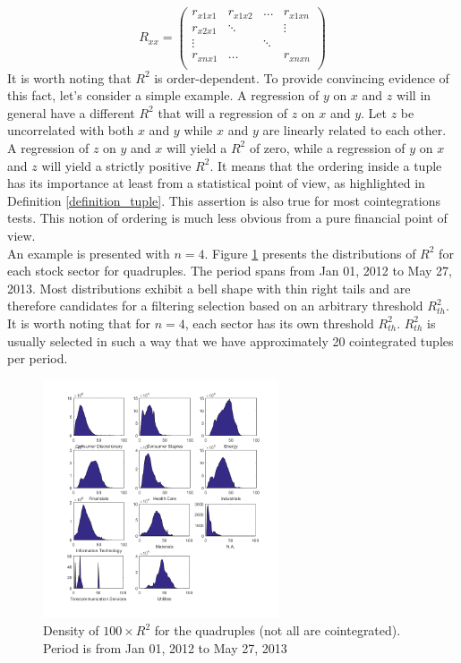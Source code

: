 \documentclass[11pt,a4,twosided,singlespacing,titlepagenumber=on]{scrreprt}
\numberwithin{equation}{chapter} %
\theoremstyle{remark}
\begin{document}
\begin{equation}
R_{xx} =\begin{pmatrix}
r_{x1x1}    & r_{x1x2} & ...  & r_{x1xn}  \\
r_{x2x1}    & \ddots &   & \vdots  \\
\vdots       &   & \ddots &   \\
r_{xnx1}    & \hdots &   & r_{xnxn} \label{rxx} \\
\end{pmatrix} 
\end{equation}
It is worth noting that $R^2$ is order-dependent. To provide convincing evidence of this fact, let's consider a simple example. A regression of $y$ on $x$ and $z$ will in general have a different $R^2$ that will a regression of $z$ on $x$ and $y$. Let $z$ be uncorrelated with both $x$ and $y$ while $x$ and $y$ are linearly related to each other. A regression of $z$ on $y$ and $x$ will yield a $R^2$ of zero, while a regression of $y$ on $x$ and $z$ will yield a strictly positive $R^2$. It means that the ordering inside a tuple has its importance at least from a statistical point of view, as highlighted in Definition \ref{definition_tuple}. This assertion is also true for most cointegrations tests. This notion of ordering is much less obvious from a pure financial point of view. \\

An example is presented with $n=4$. Figure \ref{dist_100_r2_quad} presents the distributions of $R^2$ for each stock sector for quadruples. The period spans from Jan 01, 2012 to May 27, 2013. Most distributions exhibit a bell shape with thin right tails and are therefore candidates for a filtering selection based on an arbitrary threshold $R^2_{th}$. It is worth noting that for $n=4$, each sector has its own threshold $R^2_{th}$. $R^2_{th}$ is usually selected in such a way that we have approximately 20 cointegrated tuples per period.

\begin{figure}[H]
\centering
\includegraphics[width = 0.62\textwidth]{R2_ret_Quads_Jan_1_2012_Mar_27_2013}
\caption{Density of $100 \times R^2$ for the quadruples (not all are cointegrated). Period is from Jan 01, 2012 to May 27, 2013}
\label{dist_100_r2_quad}
\end{figure}
\end{document}
